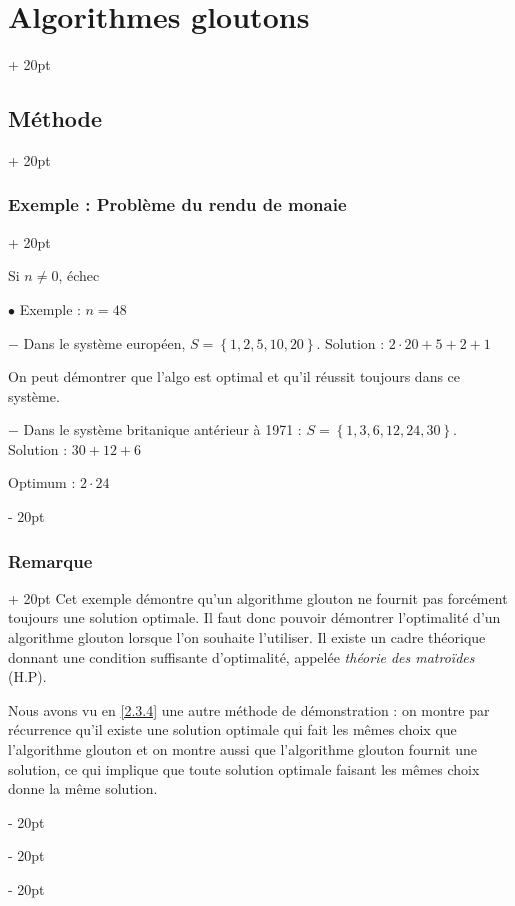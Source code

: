 \documentclass[a4paper, 12pt, twoside]{article}
\newcommand{\set}[1]{\left\{ #1 \right\}}
\newcommand{\ind}[1][20pt]{\advance\leftskip + #1}
\newcommand{\deind}[1][20pt]{\advance\leftskip - #1}
\newenvironment{indt}[2][20pt]{#2 \par \ind[#1]}{\par \deind} %
\begin{document}
\begin{indt}{\section{Algorithmes gloutons}}
\begin{indt}{\subsection{Méthode}}
\begin{indt}{\subsubsection{Exemple : Problème du rendu de monaie}}
\begin{pseudocode}
                    Si $n \neq 0$, échec
                \end{pseudocode}
                
                \vspace{12pt}
                
                $\bullet$ Exemple : $n = 48$
                
                $-$ Dans le système européen, $S = \set{1, 2, 5, 10, 20}$.
                Solution : $2 \cdot 20 + 5 + 2 + 1$
                
                On peut démontrer que l'algo est optimal et qu'il réussit toujours dans ce système.
                
                $-$ Dans le système britanique antérieur à 1971 : $S = \set{1, 3, 6, 12, 24, 30}$.
                Solution : $30 + 12 + 6$
                
                Optimum : $2 \cdot 24$
            \end{indt}
            
            \vspace{12pt}
            
            \begin{indt}{\subsubsection{Remarque}}
                Cet exemple démontre qu'un algorithme glouton ne fournit pas forcément toujours une solution optimale. Il faut donc pouvoir démontrer l'optimalité d'un algorithme glouton lorsque l'on souhaite l'utiliser. Il existe un cadre théorique donnant une condition suffisante d'optimalité, appelée \textit{théorie des matroïdes} (H.P).
                
                Nous avons vu en \ref{2.3.4} une autre méthode de démonstration : on montre par récurrence qu'il existe une solution optimale qui fait les mêmes choix que l'algorithme glouton et on montre aussi que l'algorithme glouton fournit une solution, ce qui implique que toute solution optimale faisant les mêmes choix donne la même solution.
            \end{indt}
        \end{indt}
        
        \vspace{12pt}
        

\end{indt}
\end{document}
